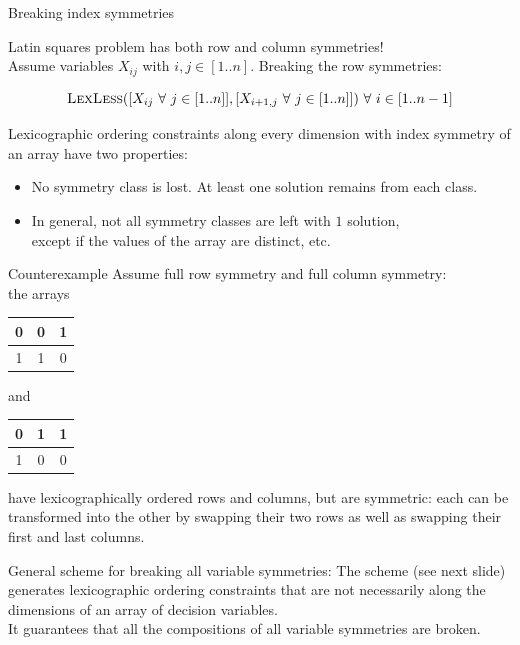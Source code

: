 \documentclass{cons-beamer}
\begin{document}
\begin{frame}{Breaking index symmetries}
\begin{example}
    \alert{Latin squares problem has both row and column symmetries!}
    \\[+5pt]
    Assume variables $X_{ij}$ with $i,j \in [1..n]$.
    Breaking the row symmetries:

    $$\textsc{LexLess}([X_{ij} \text{ } \forall \text{ } j \in [1..n]] , [X_{i+1,j} \text{ } \forall \text{ } j \in [1..n]]) \text{ } \forall \text{ } i \in [1..n-1]$$
  \end{example}
\end{frame}

\begin{frame}\label{lex2:counterex}
  Lexicographic ordering constraints along \alert{every} dimension
  with index symmetry of an array have two properties:
  \begin{itemize}
    \item[$+$] No symmetry class is lost. At least one solution remains from each class.
    \item[$-$] In general, \alert{not} all symmetry classes are left with $1$ solution, \\ except if the values of the array are distinct, etc.
  \end{itemize} \vfill
  \begin{block}{Counterexample}
    Assume full row symmetry and full column symmetry: \\ the arrays
    \begin{tabular}{|c|c|c|}
      \hline
      0 & 0 & 1 \\
      \hline
      1 & 1 & 0 \\
      \hline
    \end{tabular}
    and
    \begin{tabular}{|c|c|c|}
      \hline
      0 & 1 & 1 \\
      \hline
      1 & 0 & 0 \\
      \hline
    \end{tabular}
    have lexicographically ordered rows \alert{and} columns, but are
    symmetric: each can be transformed into the other by swapping
    their two rows as well as swapping their first and last columns.
  \end{block}
  \vfill

  General scheme for breaking all variable symmetries: The  scheme (see next slide) generates lexicographic ordering constraints that are not necessarily along the dimensions
  of an array of decision variables. \\
  \alert{It guarantees that all the compositions of all variable symmetries are broken}.
\end{frame}
\end{document}
